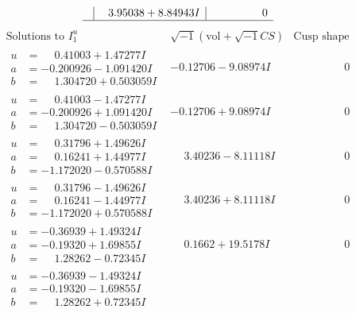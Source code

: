 \documentclass[1p]{elsarticle_modified}
\theoremstyle{definition}
\newcommand{\I}{\sqrt{-1}}
\begin{document}
$$\begin{array}{c|c|c}
 & \phantom{-}3.95038 + 8.84943 I & \phantom{-0.000000 } 0\\
 \hline 
 \end{array}$$\newpage$$\begin{array}{c|c|c}  
\text{Solutions to }I^u_{1}& \I (\text{vol} + \sqrt{-1}CS) & \text{Cusp shape}\\
 \hline 
\begin{aligned}
u &= \phantom{-}0.41003 + 1.47277 I \\
a &= -0.200926 - 1.091420 I \\
b &= \phantom{-}1.304720 + 0.503059 I\end{aligned}
 & -0.12706 - 9.08974 I & \phantom{-0.000000 } 0 \\ \hline\begin{aligned}
u &= \phantom{-}0.41003 - 1.47277 I \\
a &= -0.200926 + 1.091420 I \\
b &= \phantom{-}1.304720 - 0.503059 I\end{aligned}
 & -0.12706 + 9.08974 I & \phantom{-0.000000 } 0 \\ \hline\begin{aligned}
u &= \phantom{-}0.31796 + 1.49626 I \\
a &= \phantom{-}0.16241 + 1.44977 I \\
b &= -1.172020 - 0.570588 I\end{aligned}
 & \phantom{-}3.40236 - 8.11118 I & \phantom{-0.000000 } 0 \\ \hline\begin{aligned}
u &= \phantom{-}0.31796 - 1.49626 I \\
a &= \phantom{-}0.16241 - 1.44977 I \\
b &= -1.172020 + 0.570588 I\end{aligned}
 & \phantom{-}3.40236 + 8.11118 I & \phantom{-0.000000 } 0 \\ \hline\begin{aligned}
u &= -0.36939 + 1.49324 I \\
a &= -0.19320 + 1.69855 I \\
b &= \phantom{-}1.28262 - 0.72345 I\end{aligned}
 & \phantom{-}0.1662 + 19.5178 I & \phantom{-0.000000 } 0 \\ \hline\begin{aligned}
u &= -0.36939 - 1.49324 I \\
a &= -0.19320 - 1.69855 I \\
b &= \phantom{-}1.28262 + 0.72345 I\end{aligned}

\end{array}$$
\end{document}
